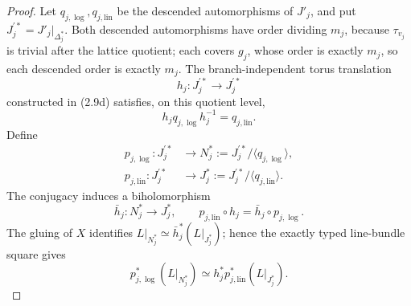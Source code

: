 \begin{proof}
Let \(q_{j,\log},q_{j,\mathrm{lin}}\) be the descended automorphisms of \(J'_j\),
and put \(J_j^{\prime *}=J'_j|_{\Delta_j^*}\).  Both descended automorphisms have
order dividing \(m_j\), because \(\tau_{v_j}\) is trivial after the lattice
quotient; each covers \(g_j\), whose order is exactly \(m_j\), so each
descended order is exactly \(m_j\).
The branch-independent torus translation
\[
 h_j:J_j^{\prime *}\longrightarrow J_j^{\prime *}
\]
constructed in (2.9d) satisfies, on this quotient level,
\[
 h_jq_{j,\log}h_j^{-1}=q_{j,\mathrm{lin}}.
\]
Define
\[
\begin{aligned}
 p_{j,\log}:J_j^{\prime *}&\longrightarrow
  N_j^*:=J_j^{\prime *}/\langle q_{j,\log}\rangle,\\
 p_{j,\mathrm{lin}}:J_j^{\prime *}&\longrightarrow
 J_j^*:=J_j^{\prime *}/\langle q_{j,\mathrm{lin}}\rangle .
\end{aligned}
\]
The conjugacy induces a biholomorphism
\[
 \bar h_j:N_j^*\longrightarrow J_j^*,\qquad
 p_{j,\mathrm{lin}}\circ h_j=\bar h_j\circ p_{j,\log}.
\]
The gluing of \(X\) identifies
\(L|_{N_j^*}\simeq\bar h_j^*(L|_{J_j^*})\); hence the exactly typed
line-bundle square gives
\[
 p_{j,\log}^*(L|_{N_j^*})
 \simeq h_j^*p_{j,\mathrm{lin}}^*(L|_{J_j^*}).
\tag{5.17-A14a}
\]


\end{proof}
